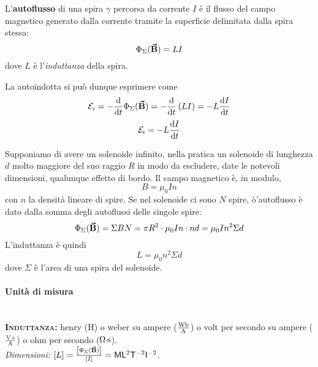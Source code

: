 \begin{define}[Autoflusso]
	L'\textbf{autoflusso} di una spira $\gamma$ percorsa da corrente $I$ è il flusso del campo magnetico generato dalla corrente tramite la superficie delimitata dalla spira stessa:
	\begin{equation}
		\Phi_{\Sigma}(\vb*{\va{B}})=LI
	\end{equation}
	dove $L$ è l'\textit{induttanza} della spira.
\end{define}
La \fem autoindotta si può dunque esprimere come
\begin{equation*}
	\mathcal{E}_i=-\dv{t}\Phi_{\Sigma}(\vb*{\va{B}})=-\dv{t}\left(LI\right)=-L\dv{I}{t}
\end{equation*}
\begin{equation}
	\mathcal{E}_i=-L\dv{I}{t}
\end{equation}
\begin{example}
	Supponiamo di avere un solenoide infinito, nella pratica un solenoide di lunghezza $d$ molto maggiore del suo raggio $R$ in modo da escludere, date le notevoli dimensioni, qualunque effetto di bordo. Il campo magnetico è, in modulo,
	\begin{equation*}
		B=\mu_0 I n
	\end{equation*}
	con $n$ la densità lineare di spire. Se nel solenoide ci sono $N$ spire, ò'autoflusso è dato dalla somma degli autoflussi delle singole spire:
	\begin{equation}
		\Phi_{\Sigma}(\vb*{\va{B}})=\Sigma B N=\pi R^2 \cdot \mu_0 I n \cdot nd=\mu_0 I n^2\Sigma d
	\end{equation}
	L'induttanza è quindi
	\begin{equation}
		L=\mu_0 n^2\Sigma d
	\end{equation}
	dove $\Sigma$ è l'area di una spira del solenoide.
\end{example}
\paragraph{Unità di misura}
\begin{units}~\\
	\textbf{\textsc{Induttanza:}} henry ($\unit{\henry}$) o weber su ampere  ($\unit[per-mode = fraction]{\weber\per\ampere}$) o volt per secondo su ampere ($\unit[per-mode = fraction]{\volt\second\per\ampere}$) o ohm per secondo ($\unit[per-mode = fraction]{\ohm\second}$).\\
	\textit{Dimensioni:} $[L]=\frac{\left[\Phi_{\Sigma}(\vb*{\va{B}})\right]}{\left[I\right]}=\mathsf{M} \mathsf{L}^2 \mathsf{T}^{-2} \mathsf{I}^{-2}$.
\end{units}
